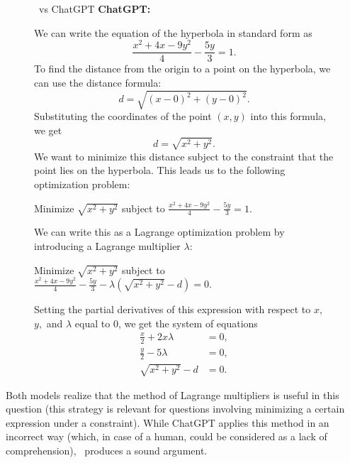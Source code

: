\begin{figure}[H]
\begin{AIbox}{\DV \ vs ChatGPT}
{\bf ChatGPT:} \\
{\scriptsize
We can write the equation of the hyperbola in standard form as
\[\frac{x^2 + 4x - 9y^2}{4} - \frac{5y}{3} = 1.\]To find the distance from the origin to a point on the hyperbola, we can use the distance formula:
\[d = \sqrt{(x - 0)^2 + (y - 0)^2}.\]Substituting the coordinates of the point $(x,y)$ into this formula, we get
\[d = \sqrt{x^2 + y^2}.\]We want to minimize this distance subject to the constraint that the point lies on the hyperbola. This leads us to the following optimization problem:

\hspace{0.25\textwidth} Minimize $\sqrt{x^2 + y^2}$ subject to $\frac{x^2 + 4x - 9y^2}{4} - \frac{5y}{3} = 1.$

We can write this as a Lagrange optimization problem by introducing a Lagrange multiplier $\lambda$:

\hspace{0.15\textwidth} Minimize $\sqrt{x^2 + y^2}$ subject to $\frac{x^2 + 4x - 9y^2}{4} - \frac{5y}{3} - \lambda (\sqrt{x^2 + y^2} - d) = 0.$

Setting the partial derivatives of this expression with respect to $x,$ $y,$ and $\lambda$ equal to 0, we get the system of equations
\begin{align*}
\frac{x}{2} + 2x\lambda &= 0, \\
\frac{y}{2} - 5\lambda &= 0, \\
\sqrt{x^2 + y^2} - d &= 0.
\end{align*}
}
\end{AIbox}
\end{figure}
Both models realize that the method of Lagrange multipliers is useful in this question (this strategy is relevant for questions involving minimizing a certain expression under a constraint). While ChatGPT applies this method in an incorrect way (which, in case of a human, could be considered as a lack of comprehension), \DV \ produces a sound argument.



